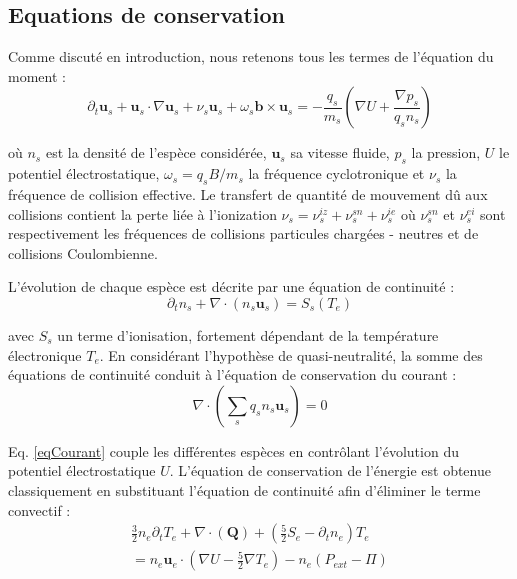 \subsection{Equations de conservation}
Comme discuté en introduction, nous retenons tous les termes de l'équation du moment :
\begin{equation}
	\partial_t \mathbf{u}_s + \mathbf{u}_s\cdot\nabla\mathbf{u}_s+\nu_s\mathbf{u}_s+\omega_s\mathbf{b}\times\mathbf{u}_s=-\frac{q_s}{m_s}\left(\nabla U+\frac{\nabla p_s}{q_sn_s}\right)
\end{equation}

où $n_s$ est la densité de l'espèce considérée, $\mathbf{u}_s$ sa vitesse fluide, $p_s$ la pression, $U$ le potentiel électrostatique,
$\omega_s=q_sB/m_s$ la fréquence cyclotronique et $\nu_s$ la fréquence de collision effective.
Le transfert de quantité de mouvement dû aux collisions contient la perte liée à l'ionization $\nu_s=\nu_{s}^{iz}+\nu_{s}^{sn}+\nu_{s}^{ie}$
où $\nu_{s}^{sn}$ et $\nu_{s}^{ei}$ sont respectivement les fréquences de collisions particules chargées - neutres et de collisions Coulombienne.

L'évolution de chaque espèce est décrite par une équation de continuité :
\begin{equation}
	\partial_t n_s + \nabla\cdot\left(n_s\mathbf{u}_s\right)=S_s(T_e)
\end{equation}

avec $S_s$ un terme d'ionisation, fortement dépendant de 
la température électronique $T_e$. En considérant l'hypothèse de quasi-neutralité, la somme des équations de continuité 
conduit à l'équation de conservation du courant :
\begin{equation}
	\label{eqCourant}
	\nabla\cdot(\sum_sq_sn_s\mathbf{u}_s)=0
\end{equation}

Eq. \ref{eqCourant} couple les différentes espèces en contrôlant l'évolution du potentiel électrostatique $U$.
L'équation de conservation de l'énergie est obtenue classiquement en substituant l'équation de continuité 
afin d'éliminer le terme convectif :
\begin{equation}\begin{split}
\frac{3}{2}n_e\partial_tT_e + \nabla\cdot(\mathbf{Q}) + \left(\frac{5}{2}S_e-\partial_tn_e\right)T_e
\\=n_e\mathbf{u}_e\cdot\left(\nabla U-\frac{5}{2}\nabla T_e\right)-n_e\left(P_{ext}-\Pi\right)
\end{split}
\end{equation}

